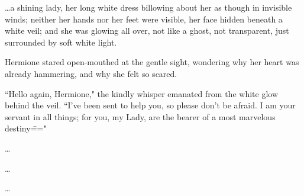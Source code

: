 {\ldots}a shining lady, her long white dress billowing about her as though in invisible winds; neither her hands nor her feet were visible, her face hidden beneath a white veil; and she was glowing all over, not like a ghost, not transparent, just surrounded by soft white light.

Hermione stared open-mouthed at the gentle sight, wondering why her heart was already hammering, and why she felt so scared.

``Hello again, Hermione," the kindly whisper emanated from the white glow behind the veil. ``I've been sent to help you, so please don't be afraid. I am your servant in all things; for you, my Lady, are the bearer of a most marvelous destiny\==="

\begin{center}
{\ldots}

{\ldots}

{\ldots}
\end{center}

